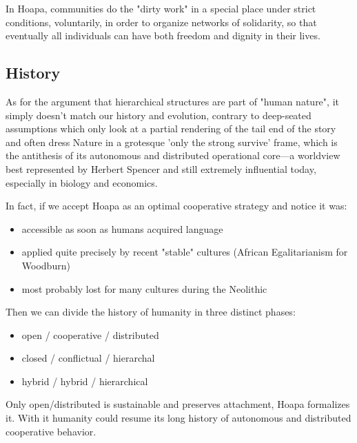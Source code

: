 \documentclass[11pt]{article}
\begin{document}
In Hoapa, communities do the "dirty work" in a special place under strict conditions, voluntarily, in order to organize networks of solidarity, so that eventually all individuals can have both freedom and dignity in their lives.

\subsection{History}

As for the argument that hierarchical structures are part of "human nature", it simply doesn't match our history and evolution, contrary to deep-seated assumptions which only look at a partial rendering of the tail end of the story and often dress Nature in a grotesque 'only the strong survive' frame, which is the antithesis of its autonomous and distributed operational core---a worldview best represented by Herbert Spencer and still extremely influential today, especially in biology and economics.

In fact, if we accept Hoapa as an optimal cooperative strategy and notice it was:

\begin{itemize}

\item accessible as soon as humans acquired language

\item applied quite precisely by recent "stable" cultures (African Egalitarianism for Woodburn)

\item most probably lost for many cultures during the Neolithic

\end{itemize}

Then we can divide the history of humanity in three distinct phases:

\begin{itemize}

\item open / cooperative / distributed

\item closed / conflictual / hierarchal

\item hybrid / hybrid / hierarchical

\end{itemize}

Only open/distributed is sustainable and preserves attachment, Hoapa formalizes it. With it humanity could resume its long history of autonomous and distributed cooperative behavior.
\end{document}
